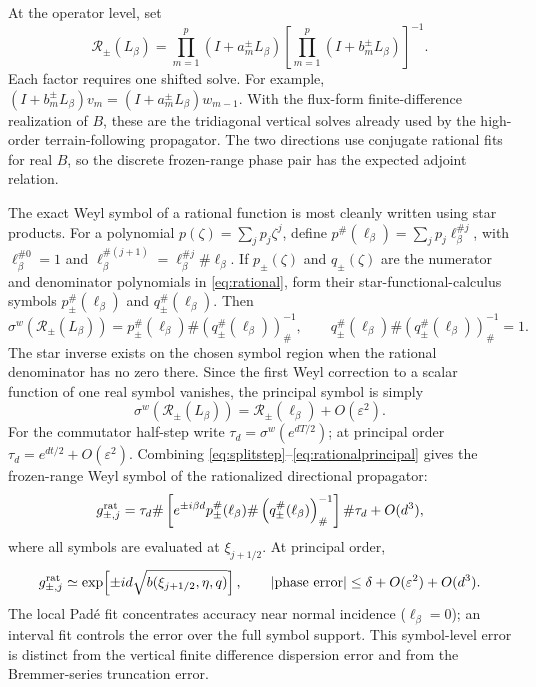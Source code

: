 \documentclass[11pt]{article}
\newcommand{\eps}{\varepsilon}
\begin{document}
At the operator level, set
\begin{equation}\label{eq:rationaloperator}
  \mathscr R_\pm(L_\beta)=
  \prod_{m=1}^{p}(I+a_m^\pm L_\beta)
  \left[\prod_{m=1}^{p}(I+b_m^\pm L_\beta)\right]^{-1}.
\end{equation}
Each factor requires one shifted solve. For example,
$(I+b_m^\pm L_\beta)v_m=(I+a_m^\pm L_\beta)w_{m-1}$.
With the flux-form finite-difference realization of $B$, these are the
tridiagonal vertical solves already used by the high-order terrain-following
propagator. The two directions use conjugate rational fits for real $B$,
so the discrete frozen-range phase pair has the expected adjoint relation.

The exact Weyl symbol of a rational function is most cleanly written using
star products. For a polynomial $p(\zeta)=\sum_j p_j\zeta^j$, define
$p^{\#}(\ell_\beta)=\sum_jp_j\ell_\beta^{\#j}$, with
$\ell_\beta^{\#0}=1$ and $\ell_\beta^{\#(j+1)}=
\ell_\beta^{\#j}\#\ell_\beta$. If $p_\pm(\zeta)$ and $q_\pm(\zeta)$ are the
numerator and denominator polynomials in \eqref{eq:rational}, form their
star-functional-calculus symbols $p_\pm^{\#}(\ell_\beta)$ and
$q_\pm^{\#}(\ell_\beta)$.
Then
\begin{equation}\label{eq:rationalsymbol}
  \sigma^w\!\left(\mathscr R_\pm(L_\beta)\right)=
  p_\pm^{\#}(\ell_\beta)\#
  \left(q_\pm^{\#}(\ell_\beta)\right)_{\#}^{-1},
  \qquad
  q_\pm^{\#}(\ell_\beta)\#
  \left(q_\pm^{\#}(\ell_\beta)\right)_{\#}^{-1}=1.
\end{equation}
The star inverse exists on the chosen symbol region when the rational
denominator has no zero there. Since the first Weyl correction to a scalar
function of one real symbol vanishes, the principal symbol is simply
\begin{equation}\label{eq:rationalprincipal}
  \sigma^w\!\left(\mathscr R_\pm(L_\beta)\right)
  =\mathscr R_\pm(\ell_\beta)+O(\eps^2).
\end{equation}
For the commutator half-step write
$\tau_d=\sigma^w(e^{dT/2})$; at principal order
$\tau_d=e^{dt/2}+O(\eps^2)$.
Combining \eqref{eq:splitstep}--\eqref{eq:rationalprincipal} gives the
frozen-range Weyl symbol of the rationalized directional propagator:
\begin{equation}\label{eq:Gsymbolrational}
  g_{\pm,j}^{\rm rat}=
  \tau_d\#\left[e^{\pm i\beta d}
  p_\pm^{\#}(\ell_\beta)\#
  \left(q_\pm^{\#}(\ell_\beta)\right)_{\#}^{-1}\right]
  \#\tau_d+O(d^3),
\end{equation}
where all symbols are evaluated at $\xi_{j+1/2}$. At principal order,
\begin{equation}\label{eq:Gsymbolerror}
  g_{\pm,j}^{\rm rat}\simeq
  \exp\!\left[\pm id\sqrt{b(\xi_{j+1/2},\eta,q)}\right],
  \qquad
  |\text{phase error}|\le\delta+O(\eps^2)+O(d^3).
\end{equation}
The local Pad\'e fit concentrates accuracy near normal incidence
($\ell_\beta=0$); an interval fit controls the error over the full symbol
support. This symbol-level error is distinct from the vertical finite
difference dispersion error and from the Bremmer-series truncation error.
\end{document}
